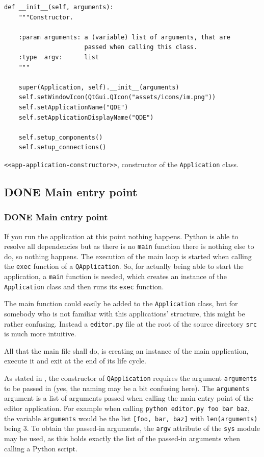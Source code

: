 \documentclass[10pt, openright, notitlepage]{scrreprt}
\begin{document}
\begin{enumerate}
\begin{listing}[H]
\begin{verbatim}
def __init__(self, arguments):
    """Constructor.

    :param arguments: a (variable) list of arguments, that are
                      passed when calling this class.
    :type  argv:      list
    """

    super(Application, self).__init__(arguments)
    self.setWindowIcon(QtGui.QIcon("assets/icons/im.png"))
    self.setApplicationName("QDE")
    self.setApplicationDisplayName("QDE")

    self.setup_components()
    self.setup_connections()
\end{verbatim}
\caption{\label{app-application-constructor}
\texttt{<<app-application-constructor>>}, constructor of the \texttt{Application} class.}
\end{listing}
\end{enumerate}
\subsection{{\bfseries\sffamily DONE} Main entry point}
\label{sec:orgfffe376}
\subsubsection{{\bfseries\sffamily DONE} Main entry point}
\label{sec:org2a4c7a6}
If you run the application at this point nothing happens. Python is able to
resolve all dependencies but as there is no \texttt{main} function there is nothing
else to do, so nothing happens. The execution of the main loop is started when
calling the \texttt{exec} function of a \texttt{QApplication}. So, for actually being able to
start the application, a \texttt{main} function is needed, which creates an instance of
the \texttt{Application} class and then runs its \texttt{exec} function.

The main function could easily be added to the \texttt{Application} class, but for
somebody who is not familiar with this applications' structure, this might be
rather confusing. Instead a \texttt{editor.py} file at the root of the source directory
\texttt{src} is much more intuitive.

All that the main file shall do, is creating an instance of the main
application, execute it and exit at the end of its life cycle.

As stated in \label{Imports}, the constructor of \texttt{QApplication} requires the
argument \texttt{arguments} to be passed in (yes, the naming may be a bit confusing
here). The \texttt{arguments} argument is a list of arguments passed when calling the
main entry point of the editor application. For example when calling \texttt{python editor.py foo bar baz},
the variable \texttt{arguments} would be the list \texttt{[foo, bar, baz]} with
\texttt{len(arguments)} being 3. To obtain the passed-in arguments, the \texttt{argv}
attribute of the \texttt{sys} module may be used, as this holds exactly the list of the
passed-in arguments when calling a Python script.
\end{document}
